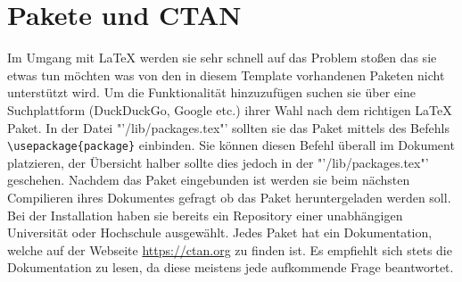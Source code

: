\section{Pakete und CTAN}

Im Umgang mit \LaTeX{} werden sie sehr schnell auf das Problem stoßen das sie etwas tun möchten was von den in diesem Template vorhandenen Paketen nicht unterstützt wird. Um die Funktionalität hinzuzufügen suchen sie über eine Suchplattform (DuckDuckGo, Google etc.) ihrer Wahl nach dem richtigen \LaTeX{} Paket. In der Datei "'/lib/packages.tex"' sollten sie das Paket mittels des Befehls \verb|\usepackage{package}| einbinden. Sie können diesen Befehl überall im Dokument platzieren, der Übersicht halber sollte dies jedoch in der "'/lib/packages.tex"' geschehen. Nachdem das Paket eingebunden ist werden sie beim nächsten Compilieren ihres Dokumentes gefragt ob das Paket heruntergeladen werden soll. Bei der Installation haben sie bereits ein Repository einer unabhängigen Universität oder Hochschule ausgewählt. Jedes Paket hat ein Dokumentation, welche auf der Webseite \url{https://ctan.org} zu finden ist. Es empfiehlt sich stets die Dokumentation zu lesen, da diese meistens jede aufkommende Frage beantwortet. 